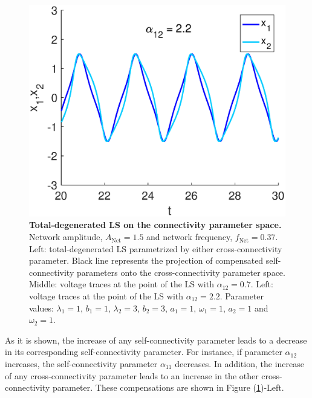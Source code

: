 \begin{figure}[h]
\begin{minipage}{0.32\linewidth}
  \end{minipage} 
   \begin{minipage}{0.32\linewidth}
  \begin{center}
\includegraphics[width=1\linewidth]{Images/photo23_3.eps}
\end{center}

  \end{minipage} 
  
   \caption{\textbf{Total-degenerated LS on the connectivity parameter space.} Network amplitude, $A_{\text{Net}} = 1.5$ and network frequency, $f_{\text{Net}} = 0.37$. Left: total-degenerated LS parametrized by either cross-connectivity parameter. Black line represents the projection of compensated self-connectivity parameters onto the cross-connectivity parameter space. Middle: voltage traces at the point of the LS with $\alpha_{12}=0.7$. Left: voltage traces at the point of the LS with $\alpha_{12}=2.2$. Parameter values: $\lambda_{1} = 1$, $b_{1}=1$, $\lambda_{2}=3$, $b_{2}=3$, $a_{1} = 1$, $\omega_{1} = 1$, $a_{2}=1$ and $\omega_{2}=1$.}
  \label{photo23}
\end{figure}

As it is shown, the increase of any self-connectivity parameter leads to a decrease in its corresponding self-connectivity parameter. For instance, if parameter $\alpha_{12}$ increases, the self-connectivity parameter $\alpha_{11}$ decreases. In addition, the increase of any cross-connectivity parameter leads to an increase in the other cross-connectivity parameter. These compensations are shown in Figure (\ref{photo23})-Left.

